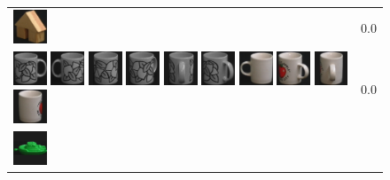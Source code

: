 {\begin{figure}[p]
\begin{tabular}{m{11cm} | m{3cm} |}
\includegraphics[width=1cm]{coil/beeld-46.eps}
& {\scriptsize 0.0}
\\
\includegraphics[width=1cm]{coil/beeld-48.eps}
\includegraphics[width=1cm]{coil/beeld-49.eps}
\includegraphics[width=1cm]{coil/beeld-50.eps}
\includegraphics[width=1cm]{coil/beeld-51.eps}
\includegraphics[width=1cm]{coil/beeld-53.eps}
\includegraphics[width=1cm]{coil/beeld-52.eps}
\includegraphics[width=1cm]{coil/beeld-37.eps}
\includegraphics[width=1cm]{coil/beeld-40.eps}
\includegraphics[width=1cm]{coil/beeld-41.eps}
\includegraphics[width=1cm]{coil/beeld-38.eps}
& {\scriptsize 0.0}
\\
\includegraphics[width=1cm]{coil/beeld-54.eps}

\end{tabular}
\end{figure}}
